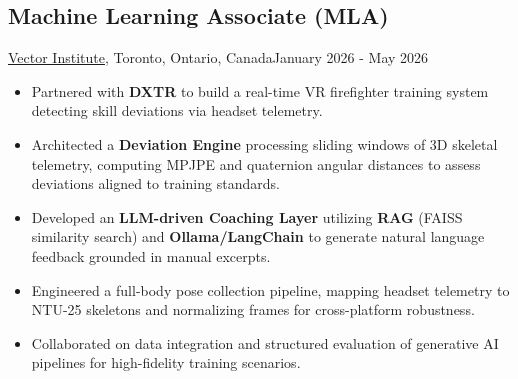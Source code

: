 \subsection{Machine Learning Associate (MLA)}{\href{https://vectorinstitute.ai/}{Vector Institute}, Toronto, Ontario, Canada}{January 2026 - May 2026}
\begin{itemize}
    \item Partnered with \textbf{DXTR} to build a real-time VR firefighter training system detecting skill deviations via headset telemetry.
    \item Architected a \textbf{Deviation Engine} processing sliding windows of 3D skeletal telemetry, computing MPJPE and quaternion angular distances to assess deviations aligned to training standards.
    \item Developed an \textbf{LLM-driven Coaching Layer} utilizing \textbf{RAG} (FAISS similarity search) and \textbf{Ollama/LangChain} to generate natural language feedback grounded in manual excerpts.
    \item Engineered a full-body pose collection pipeline, mapping headset telemetry to NTU-25 skeletons and normalizing frames for cross-platform robustness.
    \item Collaborated on data integration and structured evaluation of generative AI pipelines for high-fidelity training scenarios.
\end{itemize}
